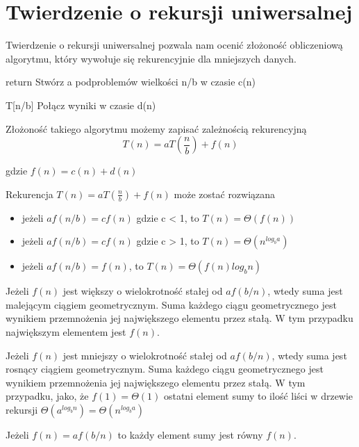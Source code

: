 \section{Twierdzenie o rekursji uniwersalnej}

Twierdzenie o rekursji uniwersalnej pozwala nam ocenić złożoność obliczeniową algorytmu, który wywołuje się rekurencyjnie dla mniejszych danych.

\begin{algorithm}[h]
  \DontPrintSemicolon

    
  {
    return
  }
  Stwórz a podproblemów wielkości n/b w czasie c(n)
  
  
  {
   	T[n/b]
  }
  Połącz wyniki w czasie d(n)
  \caption{}
  \label{recursion-example}
\end{algorithm}

Złożoność takiego algorytmu możemy zapisać zależnością rekurencyjną
\[T(n) = aT(\frac{n}{b}) + f(n)\]

gdzie 
\(f(n) = c(n) + d(n)\)
\begin{theorem}
 Rekurencja $T(n) = aT(\frac{n}{b}) + f(n)$ może zostać rozwiązana
\begin{itemize}
\item jeżeli $a f(n/b) = c f(n)$ gdzie c < 1, to $T(n) = \Theta(f(n))$
\item jeżeli $a f(n/b) = c f(n)$ gdzie c > 1, to $T(n) = \Theta(n^{log_b a})$
\item jeżeli $a f(n/b) = f(n)$, to $T(n) = \Theta(f(n) log_b n)$
\end{itemize}
 \label{Master}
\end{theorem}
Jeżeli $f(n)$ jest większy o wielokrotność stałej od $a f(b/n)$, wtedy suma jest malejącym ciągiem geometrycznym. Suma każdego ciągu geometrycznego jest wynikiem przemnożenia jej największego elementu przez stałą. W tym przypadku największym elementem jest $f(n)$. \par
Jeżeli $f(n)$ jest mniejszy o wielokrotność stałej od $a f(b/n)$, wtedy suma jest rosnący ciągiem geometrycznym. Suma każdego ciągu geometrycznego jest wynikiem przemnożenia jej największego elementu przez stałą. W tym przypadku, jako, że $f(1) = \Theta(1)$ ostatni element sumy to ilość liści w drzewie rekursji $\Theta(a^{log_b n}) = \Theta(n^{log_b a})$ 
\par
Jeżeli $f(n) = a f(b/n)$ to każdy element sumy jest równy $f(n)$.
